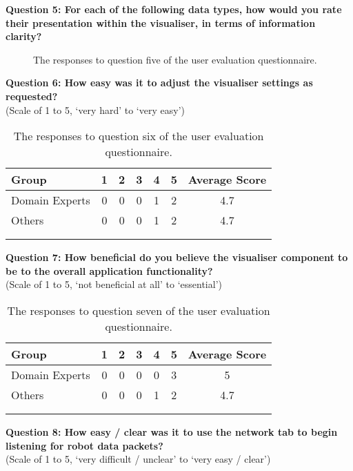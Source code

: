 \clearpage
\noindent\textbf{Question 5: For each of the following data types, how would you rate their presentation within the visualiser, in terms of information clarity?}

\begin{figure}[h]
	\centering
	\decoRule
	\caption[User Evaluation Question 5 Responses]{The responses to question five of the user evaluation questionnaire.}
	\label{fig:VisualisationLikert}
\end{figure}

\noindent\textbf{Question 6: How easy was it to adjust the visualiser settings as requested?}\\(Scale of 1 to 5, `very hard' to `very easy')

\begin{longtable}{ l c c c c c c }
 \textbf{Group} & \textbf{1} & \textbf{2} & \textbf{3} & \textbf{4} & \textbf{5} & \textbf{Average Score} \\ 
 \hline
 Domain Experts & 0 & 0 & 0 & 1 & 2 & 4.7 \\
 Others 		& 0 & 0 & 0 & 1 & 2 & 4.7 \\
 \bottomrule
\caption[User Evaluation Question 6 Responses]{The responses to question six of the user evaluation questionnaire.}\\
\label{tab:EvaluationQuestionSix}
\end{longtable}

\noindent\textbf{Question 7: How beneficial do you believe the visualiser component to be to the overall application functionality?}\\(Scale of 1 to 5, `not beneficial at all' to `essential')

\begin{longtable}{ l c c c c c c }
 \textbf{Group} & \textbf{1} & \textbf{2} & \textbf{3} & \textbf{4} & \textbf{5} & \textbf{Average Score} \\ 
 \hline
 Domain Experts & 0 & 0 & 0 & 0 & 3 & 5 \\
 Others 		& 0 & 0 & 0 & 1 & 2 & 4.7 \\
 \bottomrule
\caption[User Evaluation Question 7 Responses]{The responses to question seven of the user evaluation questionnaire.}\\
\label{tab:EvaluationQuestionSeven}
\end{longtable}

\noindent\textbf{Question 8: How easy / clear was it to use the network tab to begin listening for robot data packets?}\\(Scale of 1 to 5, `very difficult / unclear' to `very easy / clear')

